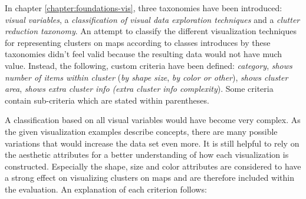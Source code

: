 In chapter \ref{chapter:foundations-vis}, three taxonomies have been introduced: \textit{visual variables}, a \textit{classification of visual data exploration techniques} and a \textit{clutter reduction taxonomy}. An attempt to classify the different visualization techniques for representing clusters on maps according to classes introduces by these taxonomies didn't feel valid because the resulting data would not have much value. Instead, the following, custom criteria have been defined: \textit{category}, \textit{shows number of items within cluster} (\textit{by shape size}, \textit{by color or other}), \textit{shows cluster area}, \textit{shows extra cluster info} \textit{(extra cluster info complexity}). Some criteria contain sub-criteria which are stated within parentheses.


A classification based on all visual variables would have become very complex. As the given visualization examples describe concepts, there are many possible variations that would increase the data set even more. It is still helpful to rely on the aesthetic attributes for a better understanding of how each visualization is constructed. Especially the shape, size and color attributes are considered to have a strong effect on visualizing clusters on maps and are therefore included within the evaluation. An explanation of each criterion follows:

